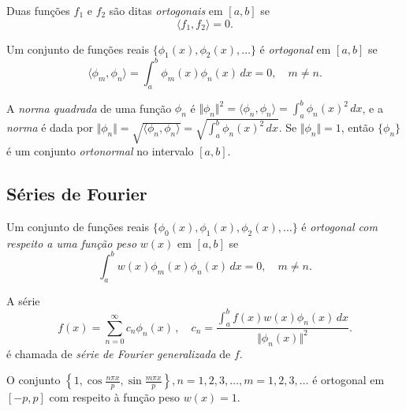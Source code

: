 \documentclass{article}
\begin{document}
\begin{defn}
    Duas funções \(f_1\) e \(f_2\) são ditas \emph{ortogonais} em \([a,b]\) se
    \begin{equation}
        \langle f_1, f_2 \rangle = 0.
    \end{equation}
\end{defn}

\begin{defn}
    Um conjunto de funções reais \(\{\phi_1(x), \phi_2(x), \ldots\}\) é \emph{ortogonal} em \([a,b]\) se
    \begin{equation}
        \langle \phi_m, \phi_n \rangle = \int_a^b \phi_m(x)\phi_n(x) \, dx = 0, \quad m \neq n.
    \end{equation}
\end{defn}

\begin{defn}
    A \emph{norma quadrada} de uma função \(\phi_n\) é \(\Vert \phi _n \Vert^2 = \langle \phi_n, \phi_n \rangle = \int_a^b \phi_n(x)^2 \, dx\), e a \emph{norma} é dada por \(\Vert \phi_n \Vert = \sqrt{\langle \phi_n, \phi_n \rangle} = \sqrt{\int_a^b \phi_n(x)^2 \, dx}\). Se \(\Vert \phi_n \Vert = 1\), então \(\{\phi_n\}\) é um conjunto \emph{ortonormal} no intervalo \([a,b]\).
\end{defn}

\subsection{Séries de Fourier}

\begin{defn}
    Um conjunto de funções reais \(\{\phi_0(x), \phi_1(x), \phi_2(x), \ldots\}\) é \emph{ortogonal com respeito a uma função peso} \(w(x)\) em \([a,b]\) se
    \begin{equation}
        \int_{a}^{b} w(x)\phi_m(x)\phi_n(x) \, dx = 0, \quad m \neq n.
    \end{equation}

    \noindent A série 
    \begin{equation}
    f(x)=\sum_{n=0}^{\infty} c_n \phi_n(x)\,, \quad c_n=\frac{\int_{a}^{b} f(x)w(x)\phi_n(x) \, dx}{\Vert \phi_n(x)\Vert^2}.
    \end{equation}
    \noindent é chamada de \emph{série de Fourier generalizada} de \(f\).
\end{defn}

\begin{rem}
    O conjunto \(\left\{1, \cos\frac{n\pi x}{p}, \sin\frac{m\pi x}{p} \right\}, n=1,2,3,\ldots, m=1,2,3,\ldots\) é ortogonal em \([-p,p]\) com respeito à função peso \(w(x)=1\).
\end{rem}
\end{document}
